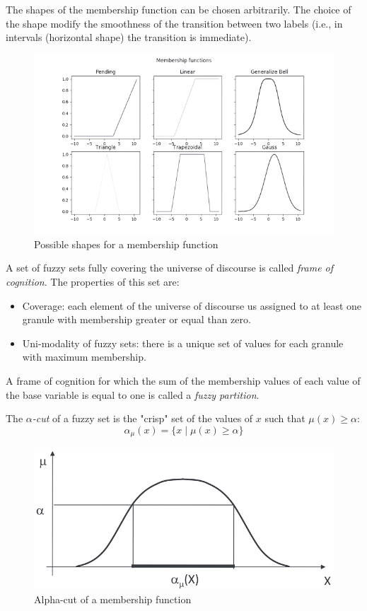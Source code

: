 \documentclass[12pt, a4paper]{report}
\newtheorem[style=M,bodystyle=\normalfont]{theorem}{Theorem}
\newtheorem[style=M,bodystyle=\normalfont]{corollary}{Corollary}
\newtheorem[style=M,bodystyle=\normalfont]{lemma}{Lemma}
\newtheorem[style=M,bodystyle=\normalfont]{definition}{Definition}
\begin{document}
    The shapes of the membership function can be chosen arbitrarily. The choice of the shape modify the smoothness of the transition 
    between two labels (i.e., in intervals (horizontal shape) the transition is immediate). 
    \begin{figure}[H]
        \centering
        \includegraphics[width=0.75\linewidth]{images/shape.png}
        \caption{Possible shapes for a membership function}
    \end{figure}
    \begin{definition}
        A set of fuzzy sets fully covering the universe of discourse is called \emph{frame of cognition}. The properties of this set are:
        \begin{itemize}
            \item Coverage: each element of the universe of discourse us assigned to at least one granule with membership greater or equal 
                than zero.
            \item Uni-modality of fuzzy sets: there is a unique set of values for each granule with maximum membership. 
        \end{itemize}
    \end{definition}
    \begin{definition}
        A frame of cognition for which the sum  of the membership values of each value of the base variable is equal to one is called 
        a \emph{fuzzy partition}. 
    \end{definition}
    \begin{definition}
        The \emph{$\alpha$-cut} of a fuzzy set is the "crisp" set of the values of $x$ such that $\mu(x) \geq \alpha$:
        \[\alpha_\mu(x)=\{x \mid \mu(x) \geq \alpha\}\]
    \end{definition}
    \begin{figure}[H]
        \centering
        \includegraphics[width=0.5\linewidth]{images/alpha.png}
        \caption{Alpha-cut of a membership function}
    \end{figure}
\end{document}
